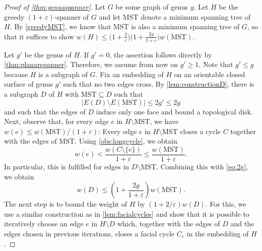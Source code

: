 \documentclass[a4paper,cleveref, autoref, thm-restate, thm-restate, UKenglish]{lipics-v2021}
\newcommand{\mst}{\mathrm{MST}}
\renewcommand{\epsilon}{\varepsilon}
\begin{document}
\begin{proof}[Proof of \cref{thm:genusspanner}]

Let $G$ be some graph of genus $g$. Let $H$ be the greedy $(1+\epsilon)$-spanner of $G$ and let MST denote a minimum spanning tree of $H$. By \cref{greedyMST}, we know that $\mst$ is also a minimum spanning tree of $G$, so that it suffices to show ${w(H)\leq \bigl( 1+\frac{2}{\epsilon}\bigl) \bigl(1+\frac{2g}{1+\epsilon}\bigl)w(\mst)}$.

Let $g'$ be the genus of $H$. If $g'=0$, the assertion follows directly by \cref{thm:planarspanner}. Therefore, we assume from now on $g'\geq 1$. Note that $g' \leq g$ because $H$ is a subgraph of $G$. Fix an embedding of $H$ on an orientable closed surface of genus $g'$ such that no two edges cross. 
By \cref{lem:constructionD}, there is a subgraph $D$ of $H$ with $\mst \subseteq D$ such that
 \begin{equation}\label{eq:2g}
 |E(D)\setminus E(\mst)| \leq 2g' \leq 2g
 \end{equation}  and such that the edges of $D$ induce only one face and bound a topological disk. 
Next, observe that, for every edge $e$ in $H\setminus \mst$, we have $w(e)\leq w(\mst)/(1+\epsilon)$: Every edge $e$ in $H \setminus \mst$ closes a cycle $C$ together with the edges of $\mst$. Using \cref{obs:longcycle}, we obtain
\begin{equation*}
w(e) < \frac{w(C\setminus \{e\})}{1+\epsilon} \leq \frac{w(\mst)}{1+\epsilon}.
\end{equation*} 
In particular, this is fulfilled for edges in $D \setminus \mst$. Combining this with \eqref{eq:2g}, we obtain
\begin{equation}\label{eq:weightofD}
w(D) \leq \left( 1+ \frac{2g}{1+\epsilon} \right) w(\mst).
\end{equation}
The next step is to bound the weight of $H$ by $(1+2/\epsilon)w(D)$. For this, we use a similar construction as in \cref{lem:facialcycles} and show that it is possible to iteratively choose an edge $e$ in $H \setminus D$ which, together with the edges of $D$ and the edges chosen in previous iterations, closes a facial cycle $C_e$ in the embedding of $H$.


\end{proof}
\end{document}
